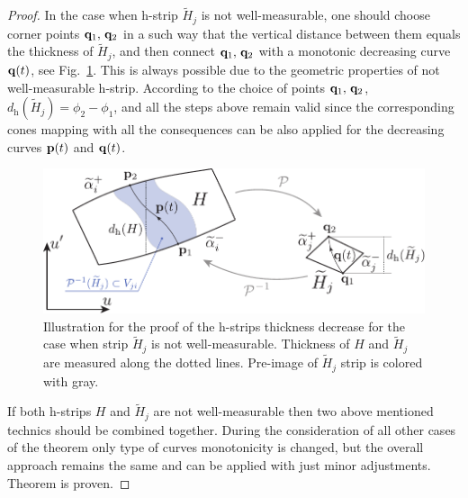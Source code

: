 \begin{proof}
	In the case when h-strip $\widetilde{H}_j$ is not well-measurable, one should choose corner points $\vb{q}_1, \, \vb{q}_2$ in a such way that the vertical distance between them equals the thickness of $\widetilde{H}_j$, and then connect $\vb{q}_1, \, \vb{q}_2$ with a monotonic decreasing curve $\vb{q}(t)$, see Fig.~\ref{fig:thickness-of-h-strip-c}.
	This is always possible due to the geometric properties of not well-measurable h-strip.
	According to the choice of points $\vb{q}_1, \, \vb{q}_2$, $d_{\mathrm{h}}(\widetilde{H}_j) = \phi_2 - \phi_1$, and all the steps above remain valid since the corresponding cones mapping with all the consequences can be also applied for the decreasing curves $\vb{p}(t)$ and $\vb{q}(t)$.
	\begin{figure}[h]
	\centering
		\includegraphics[scale = 1]{pic/thickness of h-strip (c)}
		\caption{
			Illustration for the proof of the h-strips thickness decrease for the case when strip $\widetilde{H}_j$ is not well-measurable.
			Thickness of $H$ and $\widetilde{H}_j$ are measured along the dotted lines.
			Pre-image of $\widetilde{H}_j$ strip is colored with gray.
	  }
	\label{fig:thickness-of-h-strip-c}
	\end{figure}
	
	If both h-strips $H$ and $\widetilde{H}_j$ are not well-measurable then two above mentioned technics should be combined together.
	During the consideration of all other cases of the theorem only type of curves monotonicity is changed, but the overall approach remains the same and can be applied with just minor adjustments.
	Theorem is proven.
\end{proof}

\pagebreak

